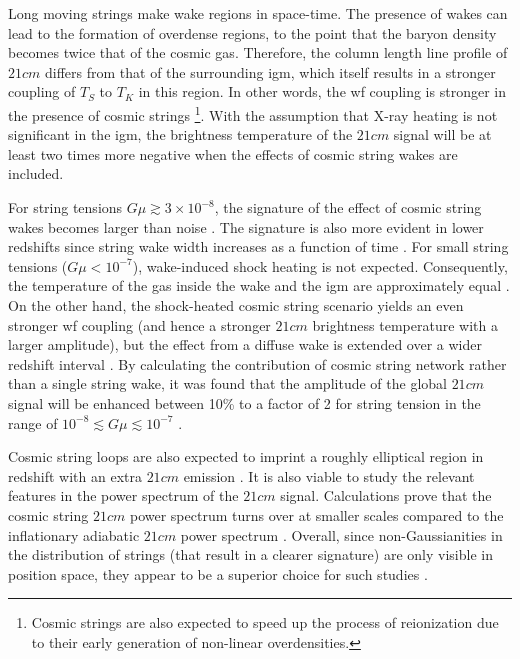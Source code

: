 \documentclass[12pt, TexShade, letterpaper]{report}
\begin{document}
Long moving strings make wake regions in space-time. The presence of wakes can lead to the formation of overdense regions, to the point that the baryon density becomes twice that of the cosmic gas. Therefore, the column length line profile of $21cm$ differs from that of the surrounding \gls{igm}, which itself results in a stronger coupling of $T_S$ to $T_K$ in this region. In other words, the \gls{wf} coupling is stronger in the presence of cosmic strings \footnote{Cosmic strings are also expected to speed up the process of reionization due to their early generation of non-linear overdensities\cite{corre_21cm_cmb}.}\cite{cosmic_string_oscar}. With the assumption that X-ray heating is not significant in the \gls{igm}, the brightness temperature of the $21cm$ signal will be at least two times more negative when the effects of cosmic string wakes are included. \par
For string tensions $G\mu \gtrsim 3\times 10^ {-8}$, the signature of the effect of cosmic string wakes becomes larger than noise \cite{WF_effect_oscar}. The signature is also more evident in lower redshifts since string wake width increases as a function of time \cite{cosmic_string_brandenberger}. For small string tensions ($G\mu< 10 ^{-7}$), wake-induced shock heating is not expected. Consequently, the temperature of the gas inside the wake and the \gls{igm} are approximately equal \cite{cosmic_string_oscar}. On the other hand, the shock-heated cosmic string scenario yields an even stronger \gls{wf} coupling (and hence a stronger $21cm$ brightness temperature with a larger amplitude), but the effect from a diffuse wake is extended over a wider redshift interval \cite{oscar_robert_shock, WF_effect_oscar, cosmic_string_oscar}. By calculating the contribution of cosmic string network rather than a single string wake, it was found that the amplitude of the global $21cm$ signal will be enhanced between 10\% to a factor of 2 for string tension in the range of $10^{-8}\lesssim G\mu\lesssim10^{-7}$  \cite{cosmic_string_oscar}.\par

Cosmic string loops are also expected to imprint a roughly elliptical region in redshift with an extra $21cm$ emission \cite{string_loop_robert}.
It is also viable to study the relevant features in the power spectrum of the $21cm$ signal. Calculations prove that the cosmic string $21cm$ power spectrum turns over at smaller scales compared to the inflationary adiabatic $21cm$ power spectrum \cite{super_string}. Overall, since non-Gaussianities in the distribution of strings (that result in a clearer signature) are only visible in position space, they appear to be a superior choice for such studies \cite{cosmic_string_brandenberger}.\par
\end{document}
